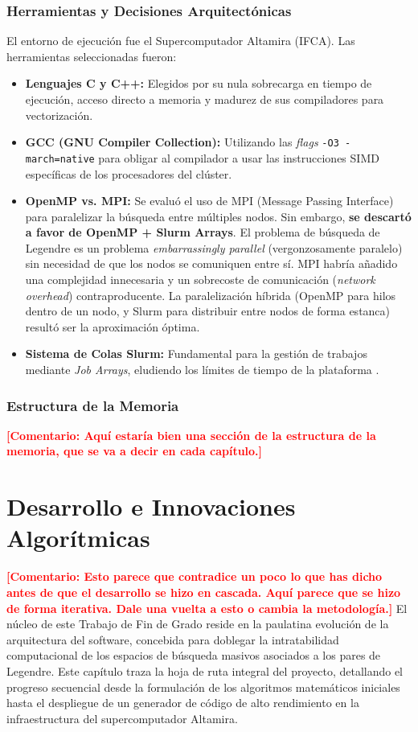 \documentclass[12pt,a4paper]{tfg_domingo}
\newcommand{\Comentario}[1]{\textcolor{red}{\textbf{[Comentario:
      #1]}}}
\begin{document}
\subsection{Herramientas y Decisiones Arquitectónicas}
El entorno de ejecución fue el Supercomputador Altamira (IFCA). Las herramientas seleccionadas fueron:
\begin{itemize}
    \item \textbf{Lenguajes C y C++:} Elegidos por su nula sobrecarga en tiempo de ejecución, acceso directo a memoria y madurez de sus compiladores para vectorización.
    \item \textbf{GCC (GNU Compiler Collection):} Utilizando las \emph{flags} \texttt{-O3 -march=native} para obligar al compilador a usar las instrucciones SIMD específicas de los procesadores del clúster.
    \item \textbf{OpenMP vs. MPI:} Se evaluó el uso de MPI (Message Passing Interface) para paralelizar la búsqueda entre múltiples nodos. Sin embargo, \textbf{se descartó a favor de OpenMP + Slurm Arrays}. El problema de búsqueda de Legendre es un problema \emph{embarrassingly parallel} (vergonzosamente paralelo) sin necesidad de que los nodos se comuniquen entre sí. MPI habría añadido una complejidad innecesaria y un sobrecoste de comunicación (\emph{network overhead}) contraproducente. La paralelización híbrida (OpenMP para hilos dentro de un nodo, y Slurm para distribuir entre nodos de forma estanca) resultó ser la aproximación óptima.
    \item \textbf{Sistema de Colas Slurm:} Fundamental para la gestión de trabajos mediante \emph{Job Arrays}, eludiendo los límites de tiempo de la plataforma \cite{yoo2003slurm}.
\end{itemize}

\subsection{Estructura de la Memoria}
\Comentario{Aquí estaría bien una sección de la estructura de la
  memoria, que se va a decir en cada capítulo.}

\chapter{Desarrollo e Innovaciones Algorítmicas}
\Comentario{Esto parece que contradice un poco lo que has dicho antes
  de que el desarrollo se hizo en cascada. Aquí parece que se hizo de
  forma iterativa. Dale una vuelta a esto o cambia la metodología.}
El núcleo de este Trabajo de Fin de Grado reside en la paulatina 
evolución de la arquitectura del software, concebida para doblegar la
intratabilidad computacional de los espacios de búsqueda masivos
asociados a los pares de Legendre. Este capítulo traza la hoja de ruta
integral del proyecto, detallando el progreso secuencial desde la
formulación de los algoritmos matemáticos iniciales hasta el
despliegue de un generador de código de alto rendimiento en la
infraestructura del supercomputador Altamira. 
\end{document}
